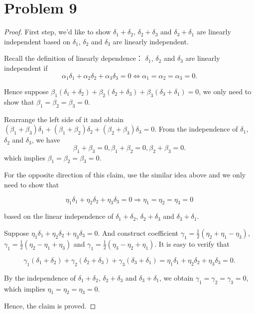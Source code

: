 \documentclass[12pt]{article}
\begin{document}
\section{Problem 9}
\begin{proof}
First step, we'd like to show $\delta_1 + \delta_2$, $\delta_2 + \delta_3$ and $\delta_3 + \delta_1$ are linearly independent based on $\delta_1$, $\delta_2$ and $\delta_3$ are linearly independent. 

Recall the definition of linearly dependence： 
 $\delta_1$, $\delta_2$ and $\delta_3$ are linearly independent if 
 $$
 \alpha_1\delta_1 + \alpha_2\delta_2 + \alpha_3\delta_3 = 0 \iff \alpha_1 = \alpha_2 = \alpha_3 = 0.
 $$
 
Hence suppose $\beta_1(\delta_1+\delta_2) + \beta_2(\delta_2+\delta_3) + \beta_3(\delta_3+\delta_1) = 0$, we only need to show that $\beta_1 = \beta_2 = \beta_3 = 0$. 

Rearrange the left side of it and obtain $(\beta_1 + \beta_3)\delta_1 + (\beta_1 + \beta_2)\delta_2 + (\beta_2 + \beta_3)\delta_3 = 0$. From the independence of $\delta_1$, $\delta_2$ and $\delta_3$, we have 
$$
\beta_1 + \beta_3 = 0, \beta_1 + \beta_2 = 0, \beta_2 + \beta_3 = 0.
$$
which implies $\beta_1 = \beta_2 = \beta_3 = 0$. 

For the opposite direction of this claim, use the similar idea above and we only need to show that 

$$
\eta_1\delta_1 + \eta_2\delta_2 + \eta_3\delta_3 = 0 \Rightarrow \eta_1 = \eta_2 = \eta_3 = 0
$$

based on the linear independence of $\delta_1 + \delta_2$, $\delta_2 + \delta_3$ and $\delta_3 + \delta_1$.

Suppose $\eta_1\delta_1 + \eta_2\delta_2 + \eta_3\delta_3 = 0$. And construct coefficient $\gamma_1 = \frac{1}{2}(\eta_2 + \eta_1 - \eta_3)$, $\gamma_1 = \frac{1}{2}(\eta_2 - \eta_1 + \eta_3)$ and $\gamma_1 = \frac{1}{2}(\eta_3 - \eta_2 + \eta_1)$. It is easy to verify that

$$
\gamma_1(\delta_1 + \delta_2) + \gamma_2(\delta_2+\delta_3) + \gamma_3(\delta_3+\delta_1) = \eta_1\delta_1 + \eta_2\delta_2 + \eta_3\delta_3 = 0.
$$

By the independence of $\delta_1 + \delta_2$, $\delta_2 + \delta_3$ and $\delta_3 + \delta_1$, we obtain $\gamma_1 = \gamma_2 = \gamma_3 = 0$, which implies $\eta_1 = \eta_2 = \eta_3 = 0$.

Hence, the claim is proved.
\end{proof}
\end{document}
